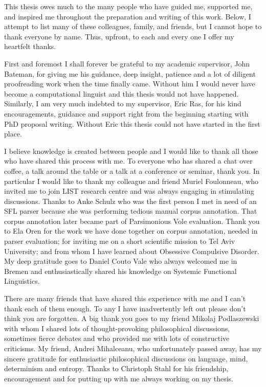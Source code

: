 
\begin{acknowledgements}      

This thesis owes much to the many people who have guided me, supported me, and inspired me throughout the preparation and writing of this work. Below, I attempt to list many of these colleagues, family, and friends, but I cannot hope to thank everyone by name. Thus, upfront, to each and every one I offer my heartfelt thanks.

First and foremost I shall forever be grateful to my academic supervisor, John Bateman, for giving me his guidance, deep insight, patience and a lot of diligent proofreading work when the time finally came. Without him I would never have become a computational linguist and this thesis would not have happened. Similarly, I am very much indebted to my supervisor, Eric Ras, for his kind encouragements, guidance and support right from the beginning starting with PhD proposal writing. Without Eric this thesis could not have started in the first place. 

I believe knowledge is created between people and I would like to thank all those who have shared this process with me. To everyone who has shared a chat over coffee, a talk around the table or a talk at a conference or seminar, thank you. In particular I would like to thank my colleague and friend Muriel Foulonneau, who invited me to join LIST research centre and was always engaging in stimulating discussions. Thanks to Anke Schulz who was the first person I met in need of an SFL parser because she was performing tedious manual corpus annotation. That corpus annotation later became part of Parsimonious Vole evaluation. Thank you to Ela Oren for the work we have done together on corpus annotation, needed in parser evaluation; for inviting me on a short scientific mission to Tel Aviv University; and from whom I have learned about Obsessive Compulsive Disorder. My deep gratitude goes to Daniel Couto Vale who always welcomed me in Bremen and enthusiastically shared his knowledge on Systemic Functional Linguistics. 

There are many friends that have shared this experience with me and I can't thank each of them enough. To any I have inadvertently left out please don't think you are forgotten. A big thank you goes to my friend Mikolaj Podlaszewski with whom I shared lots of thought-provoking philosophical discussions, sometimes fierce debates and who provided me with lots of constructive criticisms. My friend, Andrei Mihalceanu, who unfortunately passed away, has my sincere gratitude for enthusiastic philosophical discussions on language, mind, determinism and entropy. Thanks to Christoph Stahl for his friendship, encouragement and for putting up with me always working on my thesis. 


\end{acknowledgements}
